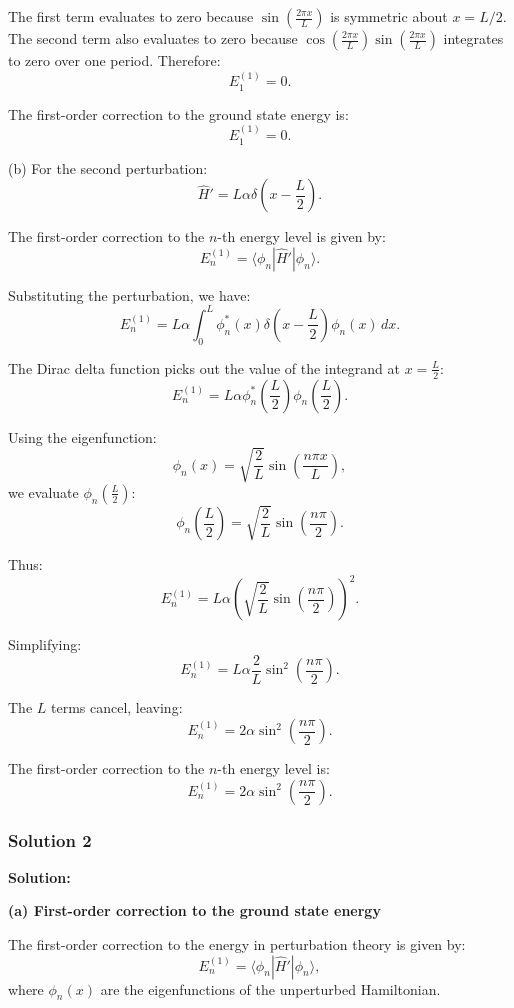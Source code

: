 \documentclass{article}
\begin{document}
The first term evaluates to zero because \(\sin\left(\frac{2\pi x}{L}\right)\) is symmetric about \(x = L/2\). The second term also evaluates to zero because \(\cos\left(\frac{2\pi x}{L}\right) \sin\left(\frac{2\pi x}{L}\right)\) integrates to zero over one period. Therefore:
\[
E_1^{(1)} = 0.
\]

The first-order correction to the ground state energy is:
\[
\boxed{E_1^{(1)} = 0.}
\]

(b) For the second perturbation:
\[
\hat{H}' = L \alpha \delta\left(x - \frac{L}{2}\right).
\]

The first-order correction to the \(n\)-th energy level is given by:
\[
E_n^{(1)} = \langle \phi_n | \hat{H}' | \phi_n \rangle.
\]

Substituting the perturbation, we have:
\[
E_n^{(1)} = L \alpha \int_0^L \phi_n^*(x) \delta\left(x - \frac{L}{2}\right) \phi_n(x) \, dx.
\]

The Dirac delta function picks out the value of the integrand at \(x = \frac{L}{2}\):
\[
E_n^{(1)} = L \alpha \phi_n^*\left(\frac{L}{2}\right) \phi_n\left(\frac{L}{2}\right).
\]

Using the eigenfunction:
\[
\phi_n(x) = \sqrt{\frac{2}{L}} \sin\left(\frac{n \pi x}{L}\right),
\]
we evaluate \(\phi_n\left(\frac{L}{2}\right)\):
\[
\phi_n\left(\frac{L}{2}\right) = \sqrt{\frac{2}{L}} \sin\left(\frac{n \pi}{2}\right).
\]

Thus:
\[
E_n^{(1)} = L \alpha \left(\sqrt{\frac{2}{L}} \sin\left(\frac{n \pi}{2}\right)\right)^2.
\]

Simplifying:
\[
E_n^{(1)} = L \alpha \frac{2}{L} \sin^2\left(\frac{n \pi}{2}\right).
\]

The \(L\) terms cancel, leaving:
\[
E_n^{(1)} = 2 \alpha \sin^2\left(\frac{n \pi}{2}\right).
\]

The first-order correction to the \(n\)-th energy level is:
\[
\boxed{E_n^{(1)} = 2 \alpha \sin^2\left(\frac{n \pi}{2}\right).}
\]

\subsubsection{Solution 2}
\textbf{Solution:}

\textbf{(a) First-order correction to the ground state energy}

The first-order correction to the energy in perturbation theory is given by:
\[
E_n^{(1)} = \langle \phi_n | \hat{H}' | \phi_n \rangle,
\]
where \(\phi_n(x)\) are the eigenfunctions of the unperturbed Hamiltonian.
\end{document}
